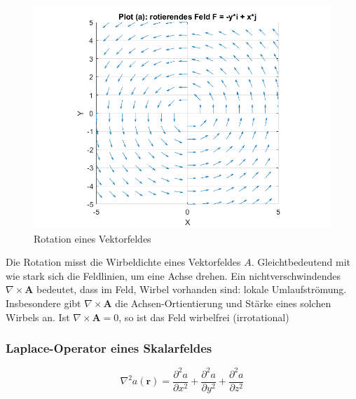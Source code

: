 \begin{figure}[h!]
	\centering
	\includegraphics[scale=0.4]{papers/helmholtz/images/rotierendes_Feld.png}
	\caption{Rotation eines Vektorfeldes}
	\label{fig:LaplaceAlg}
\end{figure}

Die Rotation misst die Wirbeldichte eines Vektorfeldes $A$. Gleichtbedeutend mit wie stark sich die Feldlinien, um eine Achse drehen. Ein nichtverschwindendes $\nabla\times \mathbf{A}$ bedeutet, dass im Feld, Wirbel vorhanden sind: lokale Umlaufströmung. Insbesondere gibt $\nabla\times \mathbf{A}$ die Achsen-Ortientierung und Stärke eines solchen Wirbels an. Ist $\nabla\times \mathbf{A}=0$, so ist das Feld wirbelfrei (irrotational) \newline



\subsubsection{Laplace-Operator eines Skalarfeldes}
\begin{equation}
\nabla^2 a(\mathbf{r}) = \frac{\partial^2 a}{\partial x^2} + \frac{\partial^2 a}{\partial y^2} + \frac{\partial^2 a}{\partial z^2}
\end{equation}

